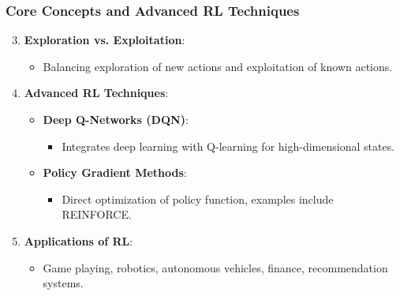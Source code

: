 \documentclass[aspectratio=169]{beamer}
\begin{document}
\begin{frame}[fragile]
    \frametitle{Core Concepts and Advanced RL Techniques}
    \begin{enumerate}
        \setcounter{enumi}{2}
        \item \textbf{Exploration vs. Exploitation}:
        \begin{itemize}
            \item Balancing exploration of new actions and exploitation of known actions.
        \end{itemize}
        
        \item \textbf{Advanced RL Techniques}:
        \begin{itemize}
            \item \textbf{Deep Q-Networks (DQN)}:
            \begin{itemize}
                \item Integrates deep learning with Q-learning for high-dimensional states.
            \end{itemize}
            \item \textbf{Policy Gradient Methods}:
            \begin{itemize}
                \item Direct optimization of policy function, examples include REINFORCE.
            \end{itemize}
        \end{itemize}
        
        \item \textbf{Applications of RL}:
        \begin{itemize}
            \item Game playing, robotics, autonomous vehicles, finance, recommendation systems.
        \end{itemize}
    \end{enumerate}
\end{frame}
\end{document}
